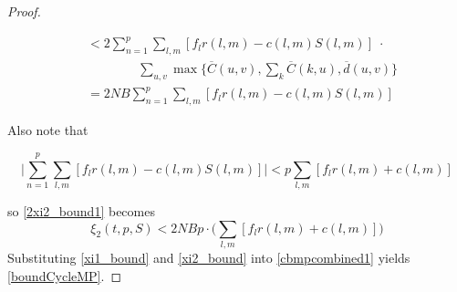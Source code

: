 \begin{proof}
\begin{small}
\begin{align}
&< 2 \sum_{n=1}^{p}  \sum_{l,m}[f_{l}r(l,m) - c(l,m)S(l,m)] \; \cdot \\ \nonumber
&\qquad \qquad \sum_{u,v} \max\Big\{  \overline{C}(u,v), \sum_{k}\overline{C}(k,u), \overline{d}(u,v)\Big\} \\
& = 2NB \sum_{n=1}^{p}  \sum_{l,m}[f_{l}r(l,m) - c(l,m)S(l,m)] \label{2xi2_bound1}
\end{align}
\end{small}Also note that 
\begin{small}
\begin{equation*}
\Big| \sum_{n=1}^{p}  \sum_{l,m}[f_{l}r(l,m) - c(l,m)S(l,m)] \Big| < p \sum_{l,m}[f_{l}r(l,m) + c(l,m)]
\end{equation*}
\end{small}
so \eqref{2xi2_bound1} becomes
\begin{equation} \label{xi2_bound}
\xi_2(t,p,S) < 2 NB p \cdot \Big( \sum_{l,m}[f_{l}r(l,m) + c(l,m)]\Big)
\end{equation}
Substituting \eqref{xi1_bound} and \eqref{xi2_bound} into \eqref{cbmpcombined1} yields \eqref{boundCycleMP}.
\end{proof}\vspace{-1em}


